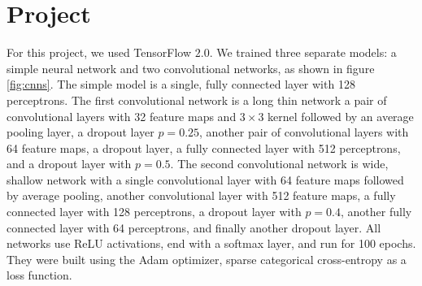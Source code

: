 \documentclass{IEEEtran}
\begin{document}
\section{Project}
For this project, we used TensorFlow \(2.0\). We trained three separate models:
a simple neural network and two convolutional networks, as shown in figure
\ref{fig:cnns}. The simple model is a single, fully connected layer with 128
perceptrons. The first convolutional network is a long thin network a pair of
convolutional layers with 32 feature maps and \(3\times 3\) kernel followed by
an average pooling layer, a dropout layer \(p = 0.25\), another pair of
convolutional layers with 64 feature maps, a dropout layer, a fully connected
layer with 512 perceptrons, and a dropout layer with \(p = 0.5\). The second
convolutional network is wide, shallow network with a single convolutional layer
with 64 feature maps followed by average pooling, another convolutional layer
with 512 feature maps, a fully connected layer with 128 perceptrons, a dropout
layer with \(p = 0.4\), another fully connected layer with 64 perceptrons, and
finally another dropout layer. All networks use ReLU activations, end with a
softmax layer, and run for 100 epochs. They were built using the Adam optimizer,
sparse categorical cross-entropy as a loss function.
\end{document}

